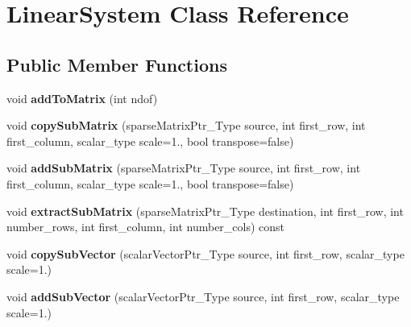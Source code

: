 \hypertarget{classLinearSystem}{}\section{Linear\+System Class Reference}
\label{classLinearSystem}
\subsection*{Public Member Functions}
\begin{DoxyCompactItemize}
\item 
\mbox{\label{classLinearSystem_a9f1a7a6a3d1dc009fb8650d5ca3a0077}} 
void {\bfseries add\+To\+Matrix} (int ndof)
\item 
\mbox{\label{classLinearSystem_acf577d804361e6841a7710b706978417}} 
void {\bfseries copy\+Sub\+Matrix} (sparse\+Matrix\+Ptr\+\_\+\+Type source, int first\+\_\+row, int first\+\_\+column, scalar\+\_\+type scale=1., bool transpose=false)
\item 
\mbox{\label{classLinearSystem_ad5025705b523e61b058f44a8a39d203d}} 
void {\bfseries add\+Sub\+Matrix} (sparse\+Matrix\+Ptr\+\_\+\+Type source, int first\+\_\+row, int first\+\_\+column, scalar\+\_\+type scale=1., bool transpose=false)
\item 
\mbox{\label{classLinearSystem_a4f671c00a0c5a50965524cd9f28a3a30}} 
void {\bfseries extract\+Sub\+Matrix} (sparse\+Matrix\+Ptr\+\_\+\+Type destination, int first\+\_\+row, int number\+\_\+rows, int first\+\_\+column, int number\+\_\+cols) const
\item 
\mbox{\label{classLinearSystem_a2509c46a5c1f88fe68227f606a4b85ca}} 
void {\bfseries copy\+Sub\+Vector} (scalar\+Vector\+Ptr\+\_\+\+Type source, int first\+\_\+row, scalar\+\_\+type scale=1.)
\item 
\mbox{\label{classLinearSystem_a2bc3f8fae6a408d159b1e66b5896d0e1}} 
void {\bfseries add\+Sub\+Vector} (scalar\+Vector\+Ptr\+\_\+\+Type source, int first\+\_\+row, scalar\+\_\+type scale=1.)
\item 
\mbox{\label{classLinearSystem_ab4050b7fdf4b9dca260dabb27f82fb2d}} 

\end{DoxyCompactItemize}
